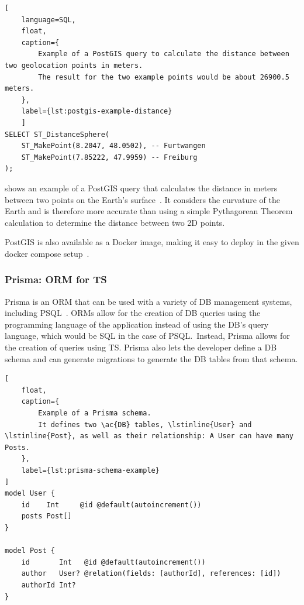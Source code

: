 \begin{lstlisting}[
    language=SQL,
    float,
    caption={
        Example of a PostGIS query to calculate the distance between two geolocation points in meters.
        The result for the two example points would be about 26900.5 meters.
    },
    label={lst:postgis-example-distance}
    ]
SELECT ST_DistanceSphere(
    ST_MakePoint(8.2047, 48.0502), -- Furtwangen
    ST_MakePoint(7.85222, 47.9959) -- Freiburg
);
\end{lstlisting}

 shows an example of a PostGIS query that calculates the distance in meters between two points on the Earth's surface~\cite{postgis_psc__osgeo_st_distancesphere_nodate}.
It considers the curvature of the Earth and is therefore more accurate than using a simple Pythagorean Theorem calculation to determine the distance between two 2D points.

PostGIS is also available as a Docker image, making it easy to deploy in the given docker compose setup~\cite{docker_inc_postgispostgis_2023}.

\subsubsection{Prisma: \acl{ORM} for \acl{TS}}

Prisma is an \ac{ORM} that can be used with a variety of \ac{DB} management systems, including \ac{PSQL}~\cite{prisma_data_inc_prisma_2023}.
\acp{ORM} allow for the creation of \ac{DB} queries using the programming language of the application instead of using the \ac{DB}'s query language, which would be \ac{SQL} in the case of \ac{PSQL}.\
Instead, Prisma allows for the creation of queries using \ac{TS}.
Prisma also lets the developer define a \ac{DB} schema and can generate migrations to generate the \ac{DB} tables from that schema.

\begin{lstlisting}[
    float,
    caption={
        Example of a Prisma schema.
        It defines two \ac{DB} tables, \lstinline{User} and \lstinline{Post}, as well as their relationship: A User can have many Posts.
    },
    label={lst:prisma-schema-example}
]
model User {
    id    Int     @id @default(autoincrement())
    posts Post[]
}
    
model Post {
    id       Int   @id @default(autoincrement())
    author   User? @relation(fields: [authorId], references: [id])
    authorId Int?
}
\end{lstlisting}

